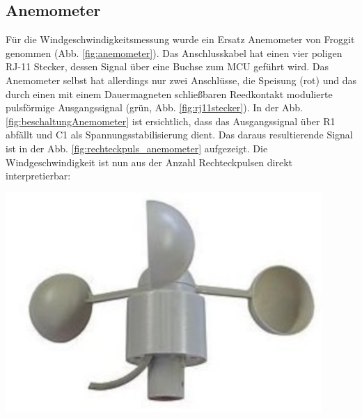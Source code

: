 \subsection{Anemometer}
\begin{minipage}{0.55\textwidth}
Für die Windgeschwindigkeitsmessung wurde ein Ersatz Anemometer von Froggit genommen (Abb. \ref{fig:anemometer}). Das Anschlusskabel hat einen vier poligen RJ-11 Stecker, dessen Signal über eine Buchse zum MCU geführt wird. Das Anemometer selbst hat allerdings nur zwei Anschlüsse, die Speisung (rot) und das durch einen mit einem Dauermagneten schließbaren Reedkontakt modulierte pulsförmige Ausgangssignal (grün, Abb. \ref{fig:rj11stecker}). In der Abb. \ref{fig:beschaltungAnemometer} ist ersichtlich, dass das Ausgangssignal über R1 abfällt und C1 als Spannungsstabilisierung dient. Das daraus resultierende Signal ist in der Abb. \ref{fig:rechteckpuls_anemometer} aufgezeigt. Die Windgeschwindigkeit ist nun aus der Anzahl Rechteckpulsen direkt interpretierbar:\\

\end{minipage}
\begin{minipage}{0.44\textwidth}
\centering
\includegraphics[width=0.9\textwidth]{graphics/Anemometer/anemometer.png}
\label{fig:anemometer}
\vspace{0.5cm}
\end{minipage}
